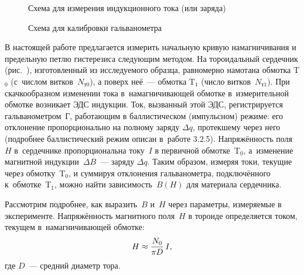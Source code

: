 
\begin{figure}[h!]
\hfil
\parbox{5cm}{%
	\begin{minipage}{5cm}
		\caption{Схема для измерения индукционного тока (или заряда)}
	\end{minipage}%
}\hfil
\parbox{5cm}{%
	\begin{minipage}{5cm}\centering
		\caption{Схема для калибровки гальванометра}
	\end{minipage}
}
\end{figure}

В настоящей работе предлагается измерить начальную кривую намагничивания
и предельную петлю гистерезиса следующим методом.
На тороидальный сердечник (рис.~), изготовленный из исследуемого образца,
равномерно намотана  обмотка T$_0$
(с~числом витков~$N_{т0}$), а поверх неё~---  обмотка
T$_1$
(число витков~$N_{т1}$).
При скачкообразном изменении тока в~намагничивающей обмотке
в~измерительной обмотке возникает ЭДС индукции. Ток, вызванный
этой ЭДС, регистрируется гальванометром~Г, работающим в баллистическом
(импульсном) режиме: его отклонение пропорционально на полному
заряду $\Delta q$, протекшему через него (подробнее баллистический режим
описан в~работе 3.2.5).
Напряжённость поля $H$ в~сердечнике пропорциональна току~$I$ в первичной
обмотке~T$_0$, а~изменение магнитной индукции~$\Delta B$~---
заряду $\Delta q$. Таким образом, измеряя токи,
текущие через обмотку~T$_0$, и суммируя отклонения гальванометра,
подключённого к~обмотке~T$_1$, можно найти
зависимость~$B(H)$ для материала сердечника.

Рассмотрим подробнее, как выразить~$B$ и~$H$ через параметры, измеряемые в
эксперименте. Напряжённость магнитного поля~$H$ в тороиде определяется током,
текущем в~намагничивающей обмотке:
\begin{equation}
	\eqmark{2}
	H\approx\frac{N_{0}}{\pi D}\,I,
\end{equation}
где $D$~--- средний диаметр тора.

